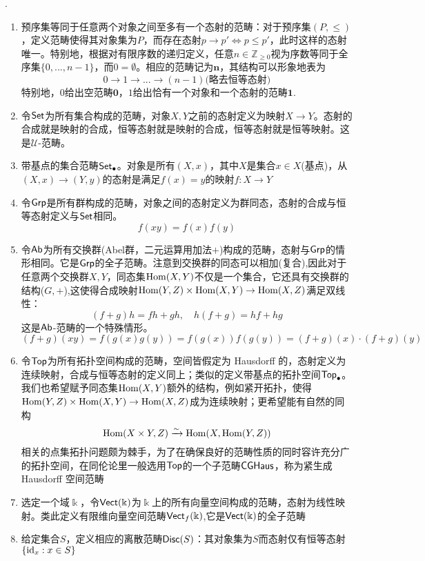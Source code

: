 \begin{Exap}[几个基本的范畴的例子].
    \begin{enumerate}
        \item 预序集等同于任意两个对象之间至多有一个态射的范畴：对于预序集$(P,\leq )$，定义范畴使得其对象集为$P$，而存在态射$p\rightarrow p' \Leftrightarrow p\leq p'$，此时这样的态射唯一。特别地，根据对有限序数的递归定义，任意$n\in \mathbb{Z}_{\geq 0}$视为序数等同于全序集$\{0,...,n-1\}$，而$0=\emptyset $。相应的范畴记为$\mathbf{n}$，其结构可以形象地表为
        \[
            0\rightarrow 1\rightarrow ... \rightarrow (n-1) \text{(略去恒等态射)}
        \]
        特别地，$0$给出空范畴$\mathbf{0}$，$1$给出恰有一个对象和一个态射的范畴$\mathbf{1}$.
        \item 令$\mathsf{Set}$为所有集合构成的范畴，对象$X,Y$之前的态射定义为映射$X\rightarrow Y$。态射的合成就是映射的合成，恒等态射就是映射的合成，恒等态射就是恒等映射。这是$\mathcal{U}$-范畴。
        \item 带基点的集合范畴$\mathsf{Set}_\bullet$。对象是所有$(X, x)$，其中$X$是集合$x\in X$(基点)，从$(X,x)\rightarrow (Y,y)$的态射是满足$f(x)=y$的映射$f:X\rightarrow Y$
        \item 令$\mathsf{Grp}$是所有群构成的范畴，对象之间的态射定义为群同态，态射的合成与恒等态射定义与$\mathsf{Set}$相同。
        \[
            f(xy)=f(x)f(y)
        \]
        \item 令$\mathsf{Ab}$为所有交换群(Abel群，二元运算用加法$+$)构成的范畴，态射与$\mathsf{Grp}$的情形相同。它是$\mathsf{Grp}$的全子范畴。注意到交换群的同态可以相加(复合),因此对于任意两个交换群$X,Y$，同态集$\operatorname{Hom}(X,Y)$不仅是一个集合，它还具有交换群的结构($G,+$),这使得合成映射$\operatorname{Hom}(Y,Z)\times \operatorname{Hom}(X,Y)\rightarrow \operatorname{Hom}(X,Z)$满足双线性：
        \[
            (f+g)h=fh+gh, \quad h(f+g)=hf+hg
        \]
        这是$\mathsf{Ab}$-范畴的一个特殊情形。
        \[
            (f+g)(xy)=f(g(x)g(y))=f(g(x))f(g(y))=(f+g)(x)\cdot (f+g)(y)
        \]

        \item 令$\mathsf{Top}$为所有拓扑空间构成的范畴，空间皆假定为 Hausdorff 的，态射定义为连续映射，合成与恒等态射的定义同上；类似的定义带基点的拓扑空间$\mathsf{Top}_\bullet$。我们也希望赋予同态集$\operatorname{Hom}(X,Y)$额外的结构，例如紧开拓扑，使得$\operatorname{Hom}(Y,Z)\times \operatorname{Hom}(X,Y)\rightarrow \operatorname{Hom}(X,Z)$成为连续映射；更希望能有自然的同构
        \[
            \operatorname{Hom}(X\times Y, Z) \xrightarrow{\sim}\operatorname{Hom}(X,\operatorname{Hom}(Y,Z))
        \]
        相关的点集拓扑问题颇为棘手，为了在确保良好的范畴性质的同时容许充分广的拓扑空间，在同伦论里一般选用$\mathsf{Top}$的一个子范畴$\mathsf{CGHaus}$，称为紧生成 Hausdorff 空间范畴
        \item 选定一个域$\Bbbk$，令$\mathsf{Vect(\Bbbk)}$为$\Bbbk$上的所有向量空间构成的范畴，态射为线性映射。类此定义有限维向量空间范畴$\mathsf{Vect}_{f}(\Bbbk)$,它是$\mathsf{Vect}(\Bbbk)$的全子范畴
        \item 给定集合$S$，定义相应的离散范畴$\mathsf{Disc}(S)$：其对象集为$S$而态射仅有恒等态射$\{\mathrm{id}_x:x\in S\}$
    \end{enumerate}
\end{Exap}
